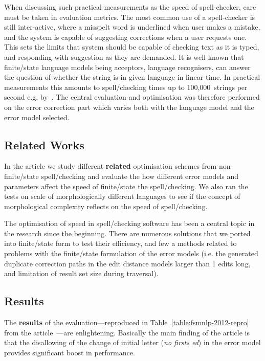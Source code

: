 \documentclass[officiallayout,final]{unihelcompling}
\begin{document}
When discussing such practical measurements as the speed of spell-checker, care
must be taken in evaluation metrics. The most common use of a spell-checker is
still inter-active, where a misspelt word is underlined when user makes a
mistake, and the system is capable of suggesting corrections when a user
requests one. This sets the limits that system should be capable of checking
text as it is typed, and responding with suggestion as they are demanded. It is
well-known that finite\-/state language models being acceptors,
language recognisers, can answer the question of whether the string is in given
language in linear time. In practical measurements this amounts to
spell\-/checking times up to 100,000~strings per second e.g.
by~\citet{silfverberg2009hfst}. The central evaluation and optimisation was
therefore performed on the error correction part which varies both with the
language model and the error model selected.

\subsection{Related Works}

In the article we study different \textbf{related} optimisation schemes from
non-finite\-/state spell\-/checking and evaluate the how different error models and
parameters affect the speed of finite\-/state the spell\-/checking. We also ran the
tests on scale of morphologically different languages to see if the concept of
morphological complexity reflects on the speed of spell\-/checking.

The optimisation of speed in spell\-/checking software has been a central
topic in the research since the beginning. There are numerous solutions that we
ported into finite\-/state form to test their efficiency, and few a methods
related to problems with the finite\-/state formulation of the error models (i.e.
the generated duplicate correction paths in the edit distance models larger
than 1 edits long, and limitation of result set size during traversal).

\subsection{Results}

The \textbf{results} of the evaluation---reproduced in
Table~\ref{table:fsmnlp-2012-repro} from the
article~---are enlightening. Basically the main
finding of the article is that the disallowing of the change of initial letter
(\emph{no firsts ed}) in the error model provides significant boost in
performance.
\end{document}
